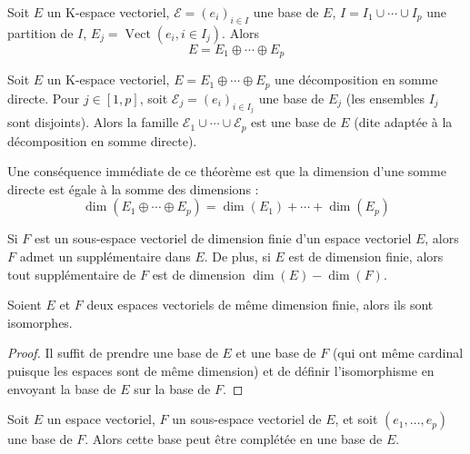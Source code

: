 \begin{thm}
Soit $E$ un K-espace vectoriel, $\mathcal{E} = (e_i)_{i\in I}$ une base de $E$, $I = I_1 \cup \cdots \cup I_p$ une partition de $I$, $E_j = \operatorname{Vect}(e_i, i \in I_j)$. Alors
\[ E = E_1 \oplus \cdots \oplus E_p \]
\end{thm}

\begin{thm}
Soit $E$ un K-espace vectoriel, $E = E_1 \oplus \cdots \oplus E_p$ une décomposition en somme directe. Pour $j \in [1,p]$, soit $\mathcal{E}_j = (e_i)_{i\in I_j}$ une base de $E_j$ (les ensembles $I_j$ sont disjoints). Alors la famille $\mathcal{E}_1 \cup \cdots \cup \mathcal{E}_p$ est une base de $E$ (dite adaptée à la décomposition en somme directe).
\end{thm}

\begin{rem}
Une conséquence immédiate de ce théorème est que la dimension d'une somme directe est égale à la somme des dimensions :
\[ \dim(E_1 \oplus \cdots \oplus E_p) = \dim(E_1) + \cdots + \dim(E_p) \]
\end{rem}

\begin{cor}
Si $F$ est un sous-espace vectoriel de dimension finie d'un espace vectoriel $E$, alors $F$ admet un supplémentaire dans $E$. De plus, si $E$ est de dimension finie, alors tout supplémentaire de $F$ est de dimension $\dim(E) - \dim(F)$.
\end{cor}

\begin{thm}[de l'isomorphisme]
Soient $E$ et $F$ deux espaces vectoriels de même dimension finie, alors ils sont isomorphes.
\end{thm}

\begin{proof}
Il suffit de prendre une base de $E$ et une base de $F$ (qui ont même cardinal puisque les espaces sont de même dimension) et de définir l'isomorphisme en envoyant la base de $E$ sur la base de $F$.
\end{proof}

\begin{thm}
Soit $E$ un espace vectoriel, $F$ un sous-espace vectoriel de $E$, et soit $(e_1,\ldots,e_p)$ une base de $F$. Alors cette base peut être complétée en une base de $E$.
\end{thm}

